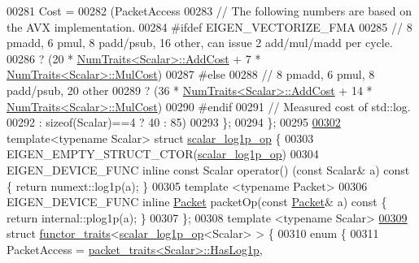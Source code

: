 \begin{DoxyCode}
00281     Cost =
00282     (PacketAccess
00283      \textcolor{comment}{// The following numbers are based on the AVX implementation.}
00284 \textcolor{preprocessor}{#ifdef EIGEN\_VECTORIZE\_FMA}
00285      \textcolor{comment}{// 8 pmadd, 6 pmul, 8 padd/psub, 16 other, can issue 2 add/mul/madd per cycle.}
00286      ? (20 * \hyperlink{group___core___module_struct_eigen_1_1_num_traits}{NumTraits<Scalar>::AddCost} + 7 * 
      \hyperlink{group___core___module_struct_eigen_1_1_num_traits}{NumTraits<Scalar>::MulCost})
00287 #\textcolor{keywordflow}{else}
00288      \textcolor{comment}{// 8 pmadd, 6 pmul, 8 padd/psub, 20 other}
00289      ? (36 * \hyperlink{group___core___module_struct_eigen_1_1_num_traits}{NumTraits<Scalar>::AddCost} + 14 * 
      \hyperlink{group___core___module_struct_eigen_1_1_num_traits}{NumTraits<Scalar>::MulCost})
00290 \textcolor{preprocessor}{#endif}
00291      \textcolor{comment}{// Measured cost of std::log.}
00292      : \textcolor{keyword}{sizeof}(Scalar)==4 ? 40 : 85)
00293   \};
00294 \};
00295 
\hyperlink{struct_eigen_1_1internal_1_1scalar__log1p__op}{00302} \textcolor{keyword}{template}<\textcolor{keyword}{typename} Scalar> \textcolor{keyword}{struct }\hyperlink{struct_eigen_1_1internal_1_1scalar__log1p__op}{scalar\_log1p\_op} \{
00303   EIGEN\_EMPTY\_STRUCT\_CTOR(\hyperlink{struct_eigen_1_1internal_1_1scalar__log1p__op}{scalar\_log1p\_op})
00304   EIGEN\_DEVICE\_FUNC \textcolor{keyword}{inline} \textcolor{keyword}{const} Scalar operator() (\textcolor{keyword}{const} Scalar& a)\textcolor{keyword}{ const }\{ \textcolor{keywordflow}{return} numext::log1p(a); \}
00305   \textcolor{keyword}{template} <\textcolor{keyword}{typename} Packet>
00306   EIGEN\_DEVICE\_FUNC \textcolor{keyword}{inline} \hyperlink{union_eigen_1_1internal_1_1_packet}{Packet} packetOp(\textcolor{keyword}{const} \hyperlink{union_eigen_1_1internal_1_1_packet}{Packet}& a)\textcolor{keyword}{ const }\{ \textcolor{keywordflow}{return} internal::plog1p(a);
       \}
00307 \};
00308 \textcolor{keyword}{template} <\textcolor{keyword}{typename} Scalar>
\hyperlink{struct_eigen_1_1internal_1_1functor__traits_3_01scalar__log1p__op_3_01_scalar_01_4_01_4}{00309} \textcolor{keyword}{struct }\hyperlink{struct_eigen_1_1internal_1_1functor__traits}{functor\_traits}<\hyperlink{struct_eigen_1_1internal_1_1scalar__log1p__op}{scalar\_log1p\_op}<Scalar> > \{
00310   \textcolor{keyword}{enum} \{
00311     PacketAccess = \hyperlink{struct_eigen_1_1internal_1_1packet__traits}{packet\_traits<Scalar>::HasLog1p},

\end{DoxyCode}
